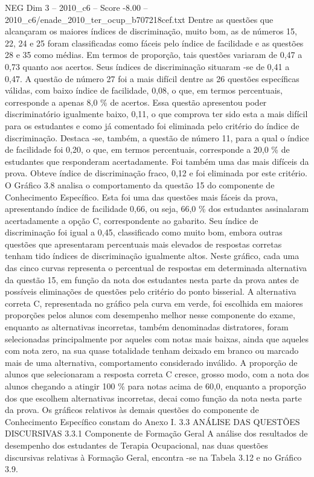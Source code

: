 \begin{textsample}{NEG Dim 3 – 2010\_c6 – Score -8.00 – 2010\_c6/enade\_2010\_ter\_ocup\_b707218cef.txt}
Dentre as questões que alcançaram os maiores índices de discriminação, muito bom, as de números 15, 22, 24 e 25 foram classificadas como fáceis pelo índice de facilidade e as questões 28 e 35 como médias.
Em termos de proporção, tais questões variaram de 0,47 a 0,73 quanto aos acertos.
Seus índices de discriminação situaram -se de 0,41 a 0,47.
A questão de número 27 foi a mais difícil dentre as 26 questões específicas válidas, com baixo índice de facilidade, 0,08, o que, em termos percentuais, corresponde a apenas 8,0 \% de acertos.
Essa questão apresentou poder discriminatório igualmente baixo, 0,11, o que comprova ter sido esta a mais difícil para os estudantes e como já comentado foi eliminada pelo critério do índice de discriminação.
Destaca -se, também, a questão de número 11, para a qual o índice de facilidade foi 0,20, o que, em termos percentuais, corresponde a 20,0 \% de estudantes que responderam acertadamente.
Foi também uma das mais difíceis da prova.
Obteve índice de discriminação fraco, 0,12 e foi eliminada por este critério.
O Gráfico 3.8 analisa o comportamento da questão 15 do componente de Conhecimento Específico.
Esta foi uma das questões mais fáceis da prova, apresentando índice de facilidade 0,66, ou seja, 66,0 \% dos estudantes assinalaram acertadamente a opção C, correspondente ao gabarito.
Seu índice de discriminação foi igual a 0,45, classificado como muito bom, embora outras questões que apresentaram percentuais mais elevados de respostas corretas tenham tido índices de discriminação igualmente altos.
Neste gráfico, cada uma das cinco curvas representa o percentual de respostas em determinada alternativa da questão 15, em função da nota dos estudantes nesta parte da prova antes de possíveis eliminações de questões pelo critério do ponto bisserial.
A alternativa correta C, representada no gráfico pela curva em verde, foi escolhida em maiores proporções pelos alunos com desempenho melhor nesse componente do exame, enquanto as alternativas incorretas, também denominadas distratores, foram selecionadas principalmente por aqueles com notas mais baixas, ainda que aqueles com nota zero, na sua quase totalidade tenham deixado em branco ou marcado mais de uma alternativa, comportamento considerado inválido.
A proporção de alunos que selecionaram a resposta correta C cresce, grosso modo, com a nota dos alunos chegando a atingir 100 \% para notas acima de 60,0, enquanto a proporção dos que escolhem alternativas incorretas, decai como função da nota nesta parte da prova.
Os gráficos relativos às demais questões do componente de Conhecimento Específico constam do Anexo I. 3.3 ANÁLISE DAS QUESTÕES DISCURSIVAS 3.3.1 Componente de Formação Geral A análise dos resultados de desempenho dos estudantes de Terapia Ocupacional, nas duas questões discursivas relativas à Formação Geral, encontra -se na Tabela 3.12 e no Gráfico 3.9.

\end{textsample}
